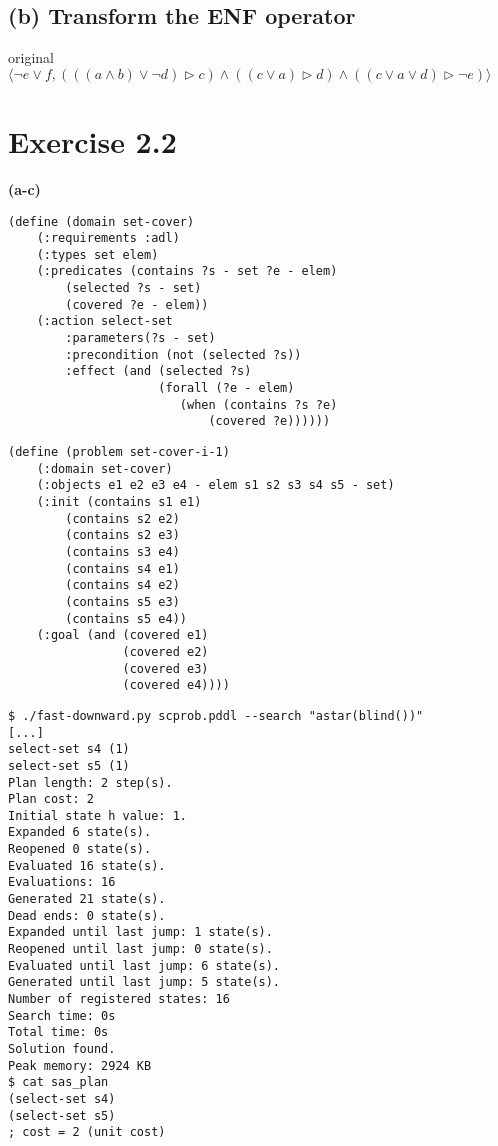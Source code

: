 \documentclass[11pt,a4paper]{article}
\begin{document}
\subsection*{(b) Transform the ENF operator}
original \newline
$ \langle
    \neg e \lor f ,
  (((a \land b) \lor \neg d) \triangleright c)   \land
  ((c \lor a) \triangleright d)  \land
  (( c \lor a \lor d) \triangleright \neg e)
  \rangle
$

\section*{Exercise 2.2}
\textbf{(a-c)}
\begin{lstlisting}[frame=single,basicstyle=\ttfamily\footnotesize,caption={set cover problem as a PDDL domain}]
(define (domain set-cover)
    (:requirements :adl)
    (:types set elem)
    (:predicates (contains ?s - set ?e - elem)
        (selected ?s - set)
        (covered ?e - elem))
    (:action select-set
        :parameters(?s - set)
        :precondition (not (selected ?s))
        :effect (and (selected ?s)
                     (forall (?e - elem)
                        (when (contains ?s ?e)
                            (covered ?e))))))
\end{lstlisting}
\begin{lstlisting}[frame=single,basicstyle=\ttfamily\footnotesize,caption={set cover instance as a PDDL problem}]
(define (problem set-cover-i-1)
    (:domain set-cover)
    (:objects e1 e2 e3 e4 - elem s1 s2 s3 s4 s5 - set)
    (:init (contains s1 e1)
        (contains s2 e2)
        (contains s2 e3)
        (contains s3 e4)
        (contains s4 e1)
        (contains s4 e2)
        (contains s5 e3)
        (contains s5 e4))
    (:goal (and (covered e1)
                (covered e2)
                (covered e3)
                (covered e4))))
\end{lstlisting}
\begin{lstlisting}[frame=single,basicstyle=\ttfamily\footnotesize,caption={solving set cover instance with fast-downward}]
$ ./fast-downward.py scprob.pddl --search "astar(blind())"
[...]
select-set s4 (1)
select-set s5 (1)
Plan length: 2 step(s).
Plan cost: 2
Initial state h value: 1.
Expanded 6 state(s).
Reopened 0 state(s).
Evaluated 16 state(s).
Evaluations: 16
Generated 21 state(s).
Dead ends: 0 state(s).
Expanded until last jump: 1 state(s).
Reopened until last jump: 0 state(s).
Evaluated until last jump: 6 state(s).
Generated until last jump: 5 state(s).
Number of registered states: 16
Search time: 0s
Total time: 0s
Solution found.
Peak memory: 2924 KB
$ cat sas_plan
(select-set s4)
(select-set s5)
; cost = 2 (unit cost)
\end{lstlisting}
\end{document}
